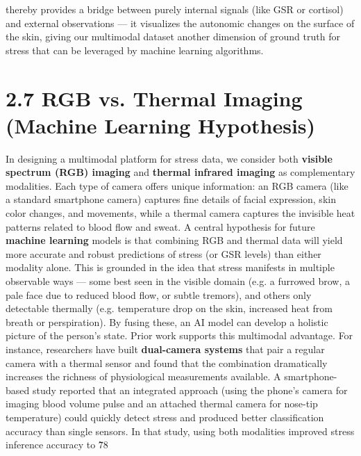 thereby provides a bridge between purely internal signals (like GSR or cortisol) and external observations --- it visualizes the autonomic changes on the surface of the skin, giving our multimodal dataset another dimension of ground truth for stress that can be leveraged by machine learning algorithms. \section{2.7 RGB vs. Thermal Imaging (Machine Learning Hypothesis)} In designing a multimodal platform for stress data, we consider both \textbf{visible spectrum (RGB) imaging} and \textbf{thermal infrared imaging} as complementary modalities. Each type of camera offers unique information: an RGB camera (like a standard smartphone camera) captures fine details of facial expression, skin color changes, and movements, while a thermal camera captures the invisible heat patterns related to blood flow and sweat. A central hypothesis for future \textbf{machine learning} models is that combining RGB and thermal data will yield more accurate and robust predictions of stress (or GSR levels) than either modality alone. This is grounded in the idea that stress manifests in multiple observable ways --- some best seen in the visible domain (e.g. a furrowed brow, a pale face due to reduced blood flow, or subtle tremors), and others only detectable thermally (e.g. temperature drop on the skin, increased heat from breath or perspiration). By fusing these, an AI model can develop a holistic picture of the person's state. Prior work supports this multimodal advantage. For instance, researchers have built \textbf{dual-camera systems} that pair a regular camera with a thermal sensor and found that the combination dramatically increases the richness of physiological measurements available. A smartphone-based study reported that an integrated approach (using the phone's camera for imaging blood volume pulse and an attached thermal camera for nose-tip temperature) could quickly detect stress and produced better classification accuracy than single sensors. In that study, using both modalities improved stress inference accuracy to \~78%